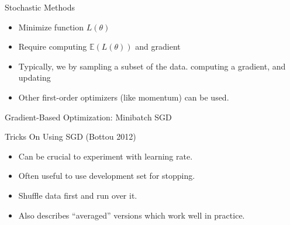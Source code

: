 \documentclass{beamer}
\begin{document}
\begin{frame}{Stochastic Methods}
  \begin{itemize}
  \item Minimize function $L(\theta)$
  \item Require computing $\mathbb{E}(L(\theta))$ and gradient
  \end{itemize}

  \begin{itemize}
  \item Typically, we by sampling a subset of the data.
    computing a gradient, and updating
  \item Other first-order optimizers (like momentum) can be used.
  \end{itemize}
\end{frame}

\begin{frame}{Gradient-Based Optimization: Minibatch SGD}
  \begin{figure}
    \begin{algorithmic}
      \EndFor{}
      \EndWhile{}
      \State{\Return{$\theta$}}
    \end{algorithmic}
  \end{figure}
\end{frame}


\begin{frame}{Tricks On Using SGD (Bottou 2012)}
  \begin{itemize}


    \item Can be crucial to experiment with learning rate.
      \air 
    \item Often useful to use development set for stopping.
      \air
    \item Shuffle data first and run over it.
      \air
    \item Also describes ``averaged'' versions which work well in practice.

  \end{itemize}
\end{frame}
\end{document}
